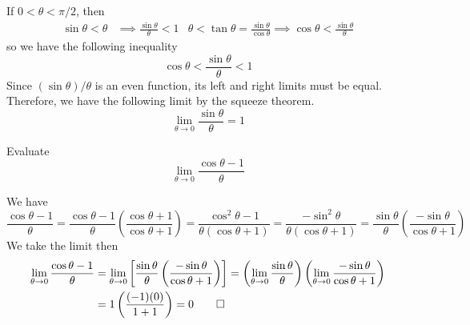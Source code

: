 If \(0<\theta<\pi/2\), then
\begin{align*}
    \sin\theta<\theta &\implies \frac{\sin\theta}{\theta}<1
    & \theta<\tan\theta=\frac{\sin\theta}{\cos\theta}\implies\cos\theta
    <\frac{\sin\theta}{\theta}
\end{align*}
so we have the following inequality
\[\cos\theta<\frac{\sin\theta}{\theta}<1\]
Since \((\sin\theta)/\theta\) is an even function, its left and right limits
must be equal.
Therefore, we have the following limit by the squeeze theorem.
\[\lim_{\theta\to 0}\frac{\sin\theta}{\theta}=1\]
\begin{problem}
    Evaluate \[\lim_{\theta\to 0}\frac{\cos\theta-1}{\theta}\]
\end{problem}
\begin{solution}
    We have
    \[\frac{\cos\theta-1}{\theta}
    =\frac{\cos\theta-1}{\theta}\left(\frac{\cos\theta+1}{\cos\theta+1}\right)
    =\frac{\cos^2\theta-1}{\theta(\cos\theta+1)}
    =\frac{-\sin^2\theta}{\theta(\cos\theta+1)}
    =\frac{\sin\theta}{\theta}\left(\frac{-\sin\theta}{\cos\theta+1}\right)\]
    We take the limit then
    \begin{align*}
        \lim_{\theta\to 0}\frac{\cos\theta-1}{\theta}
        &= \lim_{\theta\to 0}\left[\frac{\sin\theta}{\theta}
        \left(\frac{-\sin\theta}{\cos\theta+1}\right)\right]
        =\left(\lim_{\theta\to 0}\frac{\sin\theta}{\theta}\right)
        \left(\lim_{\theta\to 0}\frac{-\sin\theta}{\cos\theta+1}\right) \\
        &= 1\left(\frac{(-1)(0)}{1+1}\right)=0 \qedhere
    \end{align*}
\end{solution}